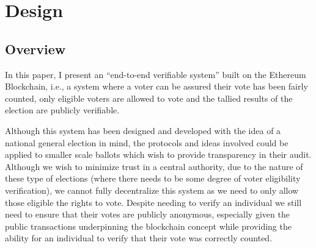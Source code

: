 \documentclass{article}
\begin{document}
    \section{Design}
    
    \subsection{Overview}
    
In this paper, I present an ``end-to-end verifiable system'' built on the Ethereum Blockchain, i.e., a system where a voter can be assured their vote has been fairly counted, only eligible voters are allowed to vote and the tallied results of the election are publicly verifiable.

Although this system has been designed and developed with the idea of a national general election in mind, the protocols and ideas involved could be applied to smaller scale ballots which wish to provide transparency in their audit. Although we wish to minimize trust in a central authority, due to the nature of these type of elections (where there needs to be some degree of voter eligibility verification), we cannot fully decentralize this system as we need to only allow those eligible the rights to vote. Despite needing to verify an individual we still need to ensure that their votes are publicly anonymous, especially given the public transactions underpinning the blockchain concept while providing the ability for an individual to verify that their vote was correctly counted.
\end{document}
